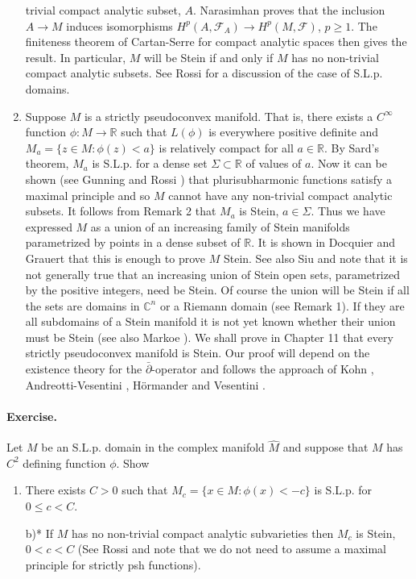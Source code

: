 \begin{enumerate}[label=\arabic*.]
trivial compact analytic subset, $A$. Narasimhan proves that the inclusion $A\to M$ induces isomorphisms $H^p(A,\mathcal F_A)\to H^p(M,\mathcal F)$, $p\geq1$. The finiteness theorem of Cartan-Serre for compact analytic spaces then gives the result. In particular, $M$ will be Stein if and only if $M$ has no non-trivial compact analytic subsets. See Rossi \cite{bib:II:rossi-h:2} for a discussion of the case of S.L.p. domains.
\item Suppose $M$ is a strictly pseudoconvex manifold. That is, there exists a $C^\infty$ function $\phi:M\to\mathbb R$ such that $L(\phi)$ is everywhere positive definite and $M_a=\{z\in M:\phi(z)<a\}$ is relatively compact for all $a\in\mathbb R$. By Sard's theorem, $M_a$ is S.L.p. for a dense set $\Sigma\subset\mathbb R$ of values of $a$. Now it can be shown (see Gunning and Rossi \cite[Section C, Chapter 10]{bib:II:gunning-r-c-and-rossi-h:1}) that plurisubharmonic functions satisfy a maximal principle and so $M$ cannot have any non-trivial compact analytic subsets. It follows from Remark 2 that $M_a$ is Stein, $a\in\Sigma$. Thus we have expressed $M$ as a union of an increasing family of Stein manifolds parametrized by points in a dense subset of $\mathbb R$. It is shown in Docquier and Grauert \cite{bib:II:docquier-f-and-grauert-h:1} that this is enough to prove $M$ Stein. See also Siu \cite{bib:II:siu-y-t:1} and note that it is not generally true that an increasing union of Stein open sets, parametrized by the positive integers, need be Stein. Of course the union will be Stein if all the sets are domains in $\mathbb C^n$ or a Riemann domain (see Remark 1). If they are all subdomains of a Stein manifold it is not yet known whether their union must be Stein (see also Markoe \cite{bib:II:markoe-a:1}). We shall prove in Chapter 11 that every strictly pseudoconvex manifold is Stein. Our proof will depend on the existence theory for the $\bar\partial$-operator and follows the approach of Kohn \cite{bib:II:kohn-j-j:1}, Andreotti-Vesentini \cite{bib:II:andreotti-a-and-vesentini-e:1}, H\"ormander \cite{bib:II:hormander-l:1} and Vesentini \cite{bib:II:vesentini-e:1}.
\end{enumerate}
\paragraph{Exercise.} Let $M$ be an S.L.p. domain in the complex manifold $\widehat M$ and suppose that $M$ has $C^2$ defining function $\phi$. Show
\begin{enumerate}[label=\alph*)]
\item There exists $C>0$ such that $M_c=\{x\in M:\phi(x)<-c\}$ is S.L.p. for $0\leq c<C$.
\item[b)*] If $M$ has no non-trivial compact analytic subvarieties then $M_c$ is Stein, $0<c<C$ (See Rossi \cite{bib:II:rossi-h:1} and note that we do not need to assume a maximal principle for strictly psh functions).
\end{enumerate}
